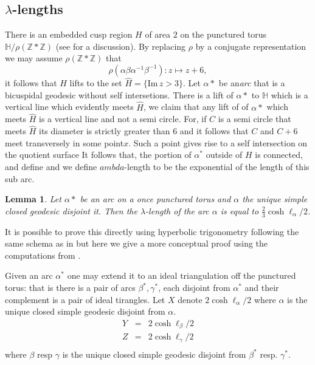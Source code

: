 \documentclass[14pt,a4paper]{amsart}
\newtheorem{lem}[thm]{Lemma}
\def\HH{\mathbb{H}}
\def\im{\mathrm{Im}\,}
\def\ZZ{\mathbb{Z}}
\begin{document}
 \subsection{$\lambda$-lengths}

 There is an embedded cusp region $H$ of area $2$ 
 on the punctured torus $\HH/\rho(\ZZ*\ZZ)$
 (see \cite{thesis} for a discussion).
 By replacing $\rho$ by a conjugate representation
 we may assume $\rho(\ZZ*\ZZ)$  that 
 $$\rho(\alpha\beta\alpha^{-1}\beta^{-1}): z \mapsto z + 6,$$
 it follows that $H$ lifts to the set $\hat{H} = \{ \im z > 3 \}$.
 Let $\alpha*$ be an\textit{arc} that is a bicuspidal geodesic
 without self intersetions.
 There is a lift of $\alpha*$ to $\HH$ which is a vertical line
 which evidently meets $\hat{H}$,
 we claim that any lift of of $\alpha*$ 
 which meets $\hat{H}$ is a vertical line and not a semi circle.
 For, if $C$ is a semi circle that meets $\hat{H}$ 
 its diameter is strictly greater than $6$ 
 and it follows that $C$ and $C + 6$ meet transversely in some point$x$.
 Such a point gives rise to a self intersection on the quotient surface
 It follows that, the portion of $\alpha^*$ outside of $H$ is connected,
 and define and we define  $ambda$-length 
 to be the exponential of the length of this sub arc.

 \begin{lem}\label{lambda length}
 Let $\alpha*$ be an arc on a once punctured torus 
 and $\alpha$ the unique 
 simple closed geodesic disjoint it.
 Then the $\lambda$-length  of the arc $\alpha$
 is equal to $\frac{2}{3}\cosh \ell_\alpha / 2$.
 \end{lem}

 It is possible to prove this directly using hyperbolic trigonometry 
 following the same schema as in \cite{thesis}
 but here we give a more conceptual proof  using the computations from \cite{saw}.

 Given an arc $\alpha^*$ one may extend it to an ideal triangulation off the punctured torus:
 that is there is a pair of arcs $\beta^*,\gamma^*$, each disjoint from  $\alpha^*$ and their complement 
 is a pair of ideal tirangles. 
 Let $X$ denote $2 \cosh \ell_\alpha / 2$ where $\alpha$ is the unique closed simple 
 geodesic disjoint from $\alpha$.
 \begin{eqnarray*}
 Y &=& 2 \cosh \ell_\beta / 2 \\
 Z  &=& 2 \cosh \ell_\gamma / 2 \\
 \end{eqnarray*}
 where $\beta$ resp $\gamma$ is the unique closed simple  geodesic disjoint from
 $\beta^*$ resp. $\gamma^*$.
\end{document}
